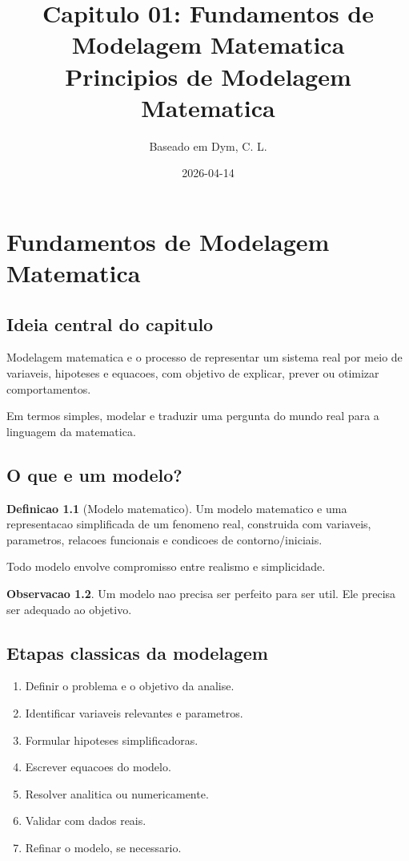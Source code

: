 \documentclass[12pt,a4paper,oneside]{book}
\title{\textbf{Capitulo 01: Fundamentos de Modelagem Matematica}\\[0.4cm]
\large Principios de Modelagem Matematica}
\author{Baseado em Dym, C. L.}
\date{2026-04-14}
\theoremstyle{definition}
\newtheorem{definition}{Definicao}[chapter]
\newtheorem{remark}[definition]{Observacao}
\begin{document}
\maketitle
\tableofcontents
\newpage

\chapter{Fundamentos de Modelagem Matematica}

\section{Ideia central do capitulo}

Modelagem matematica e o processo de representar um sistema real por meio de variaveis,
hipoteses e equacoes, com objetivo de explicar, prever ou otimizar comportamentos.

Em termos simples, modelar e traduzir uma pergunta do mundo real para a linguagem da matematica.

\section{O que e um modelo?}

\begin{definition}[Modelo matematico]
Um modelo matematico e uma representacao simplificada de um fenomeno real,
construida com variaveis, parametros, relacoes funcionais e condicoes de contorno/iniciais.
\end{definition}

Todo modelo envolve compromisso entre realismo e simplicidade.

\begin{remark}
Um modelo nao precisa ser perfeito para ser util. Ele precisa ser adequado ao objetivo.
\end{remark}

\section{Etapas classicas da modelagem}

\begin{enumerate}
    \item Definir o problema e o objetivo da analise.
    \item Identificar variaveis relevantes e parametros.
    \item Formular hipoteses simplificadoras.
    \item Escrever equacoes do modelo.
    \item Resolver analitica ou numericamente.
    \item Validar com dados reais.
    \item Refinar o modelo, se necessario.
\end{enumerate}
\end{document}
